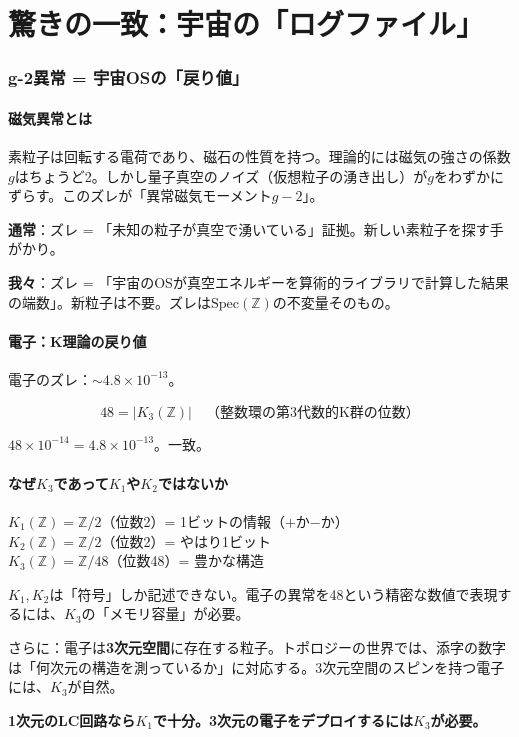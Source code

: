 \documentclass[12pt,a4paper]{article}
\newcommand{\Spec}{\mathrm{Spec}}
\begin{document}
\part{驚きの一致：宇宙の「ログファイル」}

\section{g-2異常 = 宇宙OSの「戻り値」}

\subsection{磁気異常とは}

素粒子は回転する電荷であり、磁石の性質を持つ。理論的には磁気の強さの係数$g$はちょうど2。しかし量子真空のノイズ（仮想粒子の湧き出し）が$g$をわずかにずらす。このズレが「異常磁気モーメント$g-2$」。

\begin{deepbox}
\textbf{通常}：ズレ = 「未知の粒子が真空で湧いている」証拠。新しい素粒子を探す手がかり。

\textbf{我々}：ズレ = 「宇宙のOSが真空エネルギーを算術的ライブラリで計算した結果の端数」。新粒子は不要。ズレは$\Spec(\mathbb{Z})$の不変量そのもの。
\end{deepbox}

\subsection{電子：K理論の戻り値}

電子のズレ：$\sim 4.8 \times 10^{-13}$。

$$48 = |K_3(\mathbb{Z})| \quad \text{（整数環の第3代数的K群の位数）}$$

$48 \times 10^{-14} = 4.8 \times 10^{-13}$。一致。

\subsection{なぜ$K_3$であって$K_1$や$K_2$ではないか}

\begin{mathbox}[K群の階層]
$K_1(\mathbb{Z}) = \mathbb{Z}/2$（位数2）= 1ビットの情報（$+$か$-$か）\\
$K_2(\mathbb{Z}) = \mathbb{Z}/2$（位数2）= やはり1ビット\\
$K_3(\mathbb{Z}) = \mathbb{Z}/48$（位数48）= 豊かな構造

$K_1, K_2$は「符号」しか記述できない。電子の異常を48という精密な数値で表現するには、$K_3$の「メモリ容量」が必要。

さらに：電子は\textbf{3次元空間}に存在する粒子。トポロジーの世界では、添字の数字は「何次元の構造を測っているか」に対応する。3次元空間のスピンを持つ電子には、$K_3$が自然。

\textbf{1次元のLC回路なら$K_1$で十分。3次元の電子をデプロイするには$K_3$が必要。}
\end{mathbox}
\end{document}
